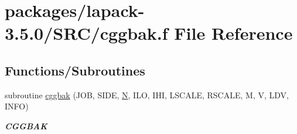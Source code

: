\hypertarget{cggbak_8f}{}\section{packages/lapack-\/3.5.0/\+S\+R\+C/cggbak.f File Reference}
\label{cggbak_8f}
\subsection*{Functions/\+Subroutines}
\begin{DoxyCompactItemize}
\item 
subroutine \hyperlink{group__complexGBcomputational_ga8cb28f2267caecb904337073c604479a}{cggbak} (J\+O\+B, S\+I\+D\+E, \hyperlink{polmisc_8c_a0240ac851181b84ac374872dc5434ee4}{N}, I\+L\+O, I\+H\+I, L\+S\+C\+A\+L\+E, R\+S\+C\+A\+L\+E, M, V, L\+D\+V, I\+N\+F\+O)
\begin{DoxyCompactList}\small\item\em {\bfseries C\+G\+G\+B\+A\+K} \end{DoxyCompactList}\end{DoxyCompactItemize}

